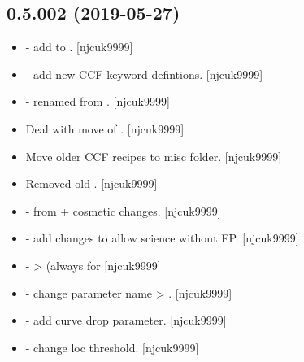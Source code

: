\documentclass[a4paper,10pt,english]{report}
\begin{document}
\subsection{0.5.002 (2019-05-27)}
\label{\detokenize{misc/changelog:id134}}\begin{itemize}
\item {} 
 - add  to . {[}njcuk9999{]}

\item {} 
 - add new CCF keyword defintions. {[}njcuk9999{]}

\item {} 
 - renamed from .
{[}njcuk9999{]}

\item {} 
Deal with move of . {[}njcuk9999{]}

\item {} 
Move older CCF recipes to misc folder. {[}njcuk9999{]}

\item {} 
Removed old . {[}njcuk9999{]}

\item {} 
 - from  + cosmetic changes.
{[}njcuk9999{]}

\item {} 
 - add changes to allow science without FP.
{[}njcuk9999{]}

\item {} 
 -  \textendash{}\textgreater{}  (always
for  {[}njcuk9999{]}

\item {} 
 - change parameter name  \textendash{}\textgreater{}
. {[}njcuk9999{]}

\item {} 
 - add curve drop parameter. {[}njcuk9999{]}

\item {} 
 - change loc threshold. {[}njcuk9999{]}


\end{itemize}
\end{document}
